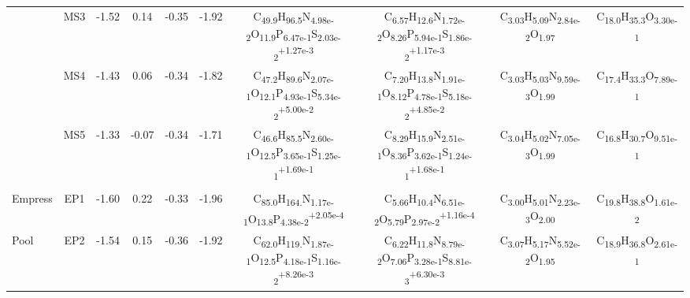 \begin{landscape}
\begin{table}
\begin{adjustbox}{width=600pt,keepaspectratio}
\begin{threeparttable}
\begin{tabular}{lccccccccc}
      & MS3   & -1.52 & 0.14  & -0.35 & -1.92 & C\textsubscript{49.9}H\textsubscript{96.5}N\textsubscript{4.98e-2}O\textsubscript{11.9}P\textsubscript{6.47e-1}S\textsubscript{2.03e-2}\textsuperscript{+1.27e-3} & C\textsubscript{6.57}H\textsubscript{12.6}N\textsubscript{1.72e-2}O\textsubscript{8.26}P\textsubscript{5.94e-1}S\textsubscript{1.86e-2}\textsuperscript{+1.17e-3} & C\textsubscript{3.03}H\textsubscript{5.09}N\textsubscript{2.84e-2}O\textsubscript{1.97} & C\textsubscript{18.0}H\textsubscript{35.3}O\textsubscript{3.30e-1} \\
      & MS4   & -1.43 & 0.06  & -0.34 & -1.82 & C\textsubscript{47.2}H\textsubscript{89.6}N\textsubscript{2.07e-1}O\textsubscript{12.1}P\textsubscript{4.93e-1}S\textsubscript{5.34e-2}\textsuperscript{+5.00e-2} & C\textsubscript{7.20}H\textsubscript{13.8}N\textsubscript{1.91e-1}O\textsubscript{8.12}P\textsubscript{4.78e-1}S\textsubscript{5.18e-2}\textsuperscript{+4.85e-2} & C\textsubscript{3.03}H\textsubscript{5.03}N\textsubscript{9.59e-3}O\textsubscript{1.99} & C\textsubscript{17.4}H\textsubscript{33.3}O\textsubscript{7.89e-1} \\
      & MS5   & -1.33 & -0.07 & -0.34 & -1.71 & C\textsubscript{46.6}H\textsubscript{85.5}N\textsubscript{2.60e-1}O\textsubscript{12.5}P\textsubscript{3.65e-1}S\textsubscript{1.25e-1}\textsuperscript{+1.69e-1} & C\textsubscript{8.29}H\textsubscript{15.9}N\textsubscript{2.51e-1}O\textsubscript{8.36}P\textsubscript{3.62e-1}S\textsubscript{1.24e-1}\textsuperscript{+1.68e-1} & C\textsubscript{3.04}H\textsubscript{5.02}N\textsubscript{7.05e-3}O\textsubscript{1.99} & C\textsubscript{16.8}H\textsubscript{30.7}O\textsubscript{9.51e-1} \\
      &       &       &       &       &       &       &       &       &  \\
Empress & EP1   & -1.60 & 0.22  & -0.33 & -1.96 & C\textsubscript{85.0}H\textsubscript{164.}N\textsubscript{1.17e-1}O\textsubscript{13.8}P\textsubscript{4.38e-2}\textsuperscript{+2.05e-4} & C\textsubscript{5.66}H\textsubscript{10.4}N\textsubscript{6.51e-2}O\textsubscript{5.79}P\textsubscript{2.97e-2}\textsuperscript{+1.16e-4} & C\textsubscript{3.00}H\textsubscript{5.01}N\textsubscript{2.23e-3}O\textsubscript{2.00} & C\textsubscript{19.8}H\textsubscript{38.8}O\textsubscript{1.61e-2} \\
Pool  & EP2   & -1.54 & 0.15  & -0.36 & -1.92 & C\textsubscript{62.0}H\textsubscript{119.}N\textsubscript{1.87e-1}O\textsubscript{12.5}P\textsubscript{4.18e-1}S\textsubscript{1.16e-2}\textsuperscript{+8.26e-3} & C\textsubscript{6.22}H\textsubscript{11.8}N\textsubscript{8.79e-2}O\textsubscript{7.06}P\textsubscript{3.28e-1}S\textsubscript{8.81e-3}\textsuperscript{+6.30e-3} & C\textsubscript{3.07}H\textsubscript{5.17}N\textsubscript{5.52e-2}O\textsubscript{1.95} & C\textsubscript{18.9}H\textsubscript{36.8}O\textsubscript{2.61e-1} \\

\end{tabular}
\end{threeparttable}
\end{adjustbox}
\end{table}
\end{landscape}

